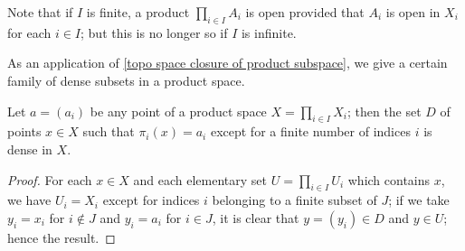 \begin{remark}
Note that if $I$ is finite, a product $\prod_{i\in I}A_i$ is open provided that $A_i$ is open in $X_i$ for each $i\in I$; but this is no longer so if $I$ is infinite.
\end{remark}
As an application of \cref{topo space closure of product subspace}, we give a certain family of dense subsets in a product space.
\begin{proposition}\label{topo space dense subset in product}
Let $a=(a_i)$ be any point of a product space $X=\prod_{i\in I}X_i$; then the set $D$ of points $x\in X$ such that $\pi_i(x)=a_i$ except for a finite number of indices $i$ is dense in $X$.
\end{proposition}
\begin{proof}
For each $x\in X$ and each elementary set $U=\prod_{i\in I}U_i$ which contains $x$, we have $U_i=X_i$ except for indices $i$ belonging to a finite subset of $J$; if we take $y_i=x_i$ for $i\notin J$ and $y_i=a_i$ for $i\in J$, it is clear that $y=(y_i)\in D$ and $y\in U$; hence the result.
\end{proof}
